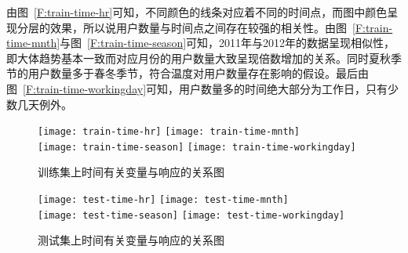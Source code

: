 由图~\ref{F:train-time-hr}可知，不同颜色的线条对应着不同的时间点，而图中颜色呈现分层的效果，所以说用户数量与时间点之间存在较强的相关性。由图~\ref{F:train-time-mnth}与图~\ref{F:train-time-season}可知，2011年与2012年的数据呈现相似性，即大体趋势基本一致而对应月份的用户数量大致呈现倍数增加的关系。同时夏秋季节的用户数量多于春冬季节，符合温度对用户数量存在影响的假设。最后由图~\ref{F:train-time-workingday}可知，用户数量多的时间绝大部分为工作日，只有少数几天例外。
\begin{figure}[htbp]
    \centering
        {\texttt{[image: train-time-hr]}}
        {\texttt{[image: train-time-mnth]}} \\
        {\texttt{[image: train-time-season]}}
        {\texttt{[image: train-time-workingday]}}
    \caption{训练集上时间有关变量与响应的关系图}\label{F:train-time}
\end{figure}

\begin{figure}[htbp]
    \centering
        {\texttt{[image: test-time-hr]}}
        {\texttt{[image: test-time-mnth]}} \\
        {\texttt{[image: test-time-season]}}
        {\texttt{[image: test-time-workingday]}}
    \caption{测试集上时间有关变量与响应的关系图}\label{F:test-time}
\end{figure}
